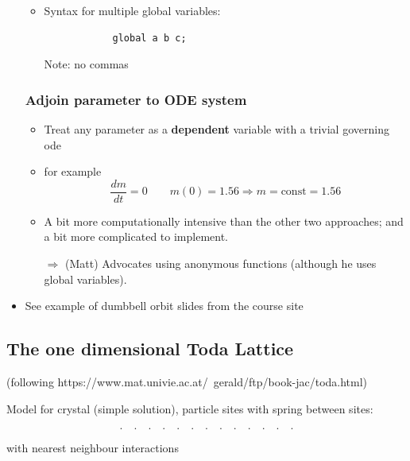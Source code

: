 \begin{itemize}
\begin{itemize}
        \item Syntax for multiple global variables:

        \begin{verbatim}
            global a b c;
        \end{verbatim}

        Note: no commas
    \end{itemize}

    \subsubsection{Adjoin parameter to ODE system}

    \begin{itemize}
        \item Treat any parameter as a \textbf{dependent} variable with a trivial governing ode
        \item for example 
        \[ \frac{dm}{dt} = 0 \qquad m(0) = 1.56 \Rightarrow m=\text{const} = 1.56\]

        \item A bit more computationally intensive than the other two approaches; and a bit more complicated to implement.


        $\Rightarrow$ (Matt) Advocates using anonymous functions (although he uses global variables).
    \end{itemize}

    \item See example of dumbbell orbit slides from the course site
\end{itemize}

\subsection{The one dimensional Toda Lattice}

(following https://www.mat.univie.ac.at/~gerald/ftp/book-jac/toda.html)\newline

Model for crystal (simple solution), particle sites with spring between sites:

\[ . \quad . \quad . \quad . \quad . \quad . \quad . \quad . \quad . \quad . \quad . \quad . \quad .\]

with nearest neighbour interactions

